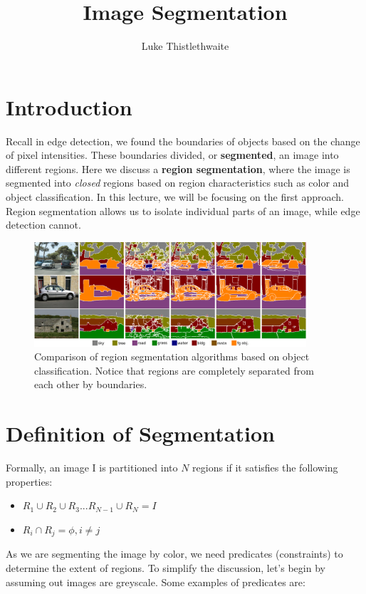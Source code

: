 \documentclass{article}
\title{Image Segmentation}
\author{ Luke Thistlethwaite}
\begin{document}
\maketitle

\section{Introduction}
Recall in edge detection, we found the boundaries of objects based on the change of pixel intensities. These boundaries divided, or \textbf{segmented}, an image into different regions. Here we discuss a \textbf{region segmentation}, where the image is segmented into \textit{closed} regions based on region characteristics such as color and object classification. In this lecture, we will be focusing on the first approach. Region segmentation allows us to isolate individual parts of an image, while edge detection cannot.

\begin{figure}[!htb]
    \begin{center}
        \includegraphics[width=0.9\textwidth]{L5F1.png}
        \vspace{-10pt}
    \end{center}
    \caption{Comparison of region segmentation algorithms based on object classification. Notice that regions are completely separated from each other by boundaries.}
\end{figure}

\section{Definition of Segmentation}
Formally, an image I is partitioned into $N$ regions if it satisfies the following properties:

\begin{itemize}
    \item $R_1 \cup R_2 \cup R_3 ... R_{N-1} \cup  R_N = I$
    \item $R_i \cap R_j = \phi, i \ne j$
\end{itemize}
\noindent
As we are segmenting the image by color, we need predicates (constraints) to determine the extent of regions. To simplify the discussion, let's begin by assuming out images are greyscale. Some examples of  predicates are:
\end{document}
